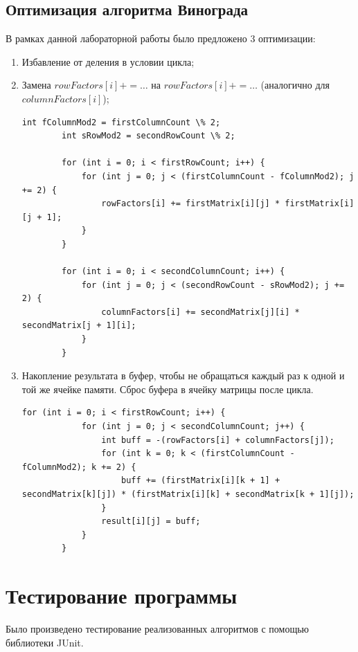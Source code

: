 \documentclass[12pt]{report}
\begin{document}
\subsection{Оптимизация алгоритма Винограда}
В рамках данной лабораторной работы было предложено 3 оптимизации:
\begin{enumerate}
	\item Избавление от деления в условии цикла;
	\item Замена $rowFactors[i] += …$ на $rowFactors[i] += …$ (аналогично для $columnFactors[i]$);
	
\newpage
\begin{lstlisting}[label=some-code,caption=Оптимизации алгоритма Винограда №1 и №2]
	    int fColumnMod2 = firstColumnCount \% 2;
        int sRowMod2 = secondRowCount \% 2;

        for (int i = 0; i < firstRowCount; i++) {
            for (int j = 0; j < (firstColumnCount - fColumnMod2); j += 2) {
                rowFactors[i] += firstMatrix[i][j] * firstMatrix[i][j + 1];
            }
        }

        for (int i = 0; i < secondColumnCount; i++) {
            for (int j = 0; j < (secondRowCount - sRowMod2); j += 2) {
                columnFactors[i] += secondMatrix[j][i] * secondMatrix[j + 1][i];
            }
        }
\end{lstlisting}

\item Накопление результата в буфер, чтобы не обращаться каждый раз к одной и той же ячейке памяти. Сброс буфера в ячейку матрицы после цикла.
\begin{lstlisting}[label=some-code,caption=Оптимизации алгоритма Винограда №3]
    for (int i = 0; i < firstRowCount; i++) {
            for (int j = 0; j < secondColumnCount; j++) {
                int buff = -(rowFactors[i] + columnFactors[j]);
                for (int k = 0; k < (firstColumnCount - fColumnMod2); k += 2) {
                    buff += (firstMatrix[i][k + 1] + secondMatrix[k][j]) * (firstMatrix[i][k] + secondMatrix[k + 1][j]);
                }
                result[i][j] = buff;
            }
        }
\end{lstlisting}
\end{enumerate}

\section{Тестирование программы}

Было произведено тестирование реализованных алгоритмов с помощью библиотеки JUnit.
\end{document}
